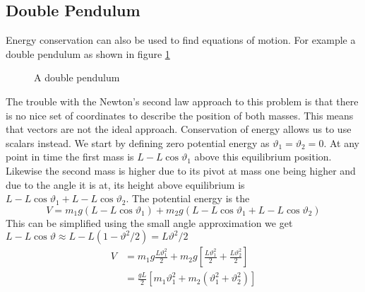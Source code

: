 \documentclass{article}
\begin{document}
    \subsection{Double Pendulum}\label{sec:double pendulum}
    Energy conservation can also be used to find equations of motion.
    For example a double pendulum as shown in figure \ref{fig:double pendulum}
    \begin{figure}[ht]
        \centering
        \caption{A double pendulum}
        \label{fig:double pendulum}
    \end{figure}
    The trouble with the Newton's second law approach to this problem is that there is no nice set of coordinates to describe the position of both masses.
    This means that vectors are not the ideal approach.
    Conservation of energy allows us to use scalars instead.
    We start by defining zero potential energy as \(\vartheta_1 = \vartheta_2 = 0\).
    At any point in time the first mass is \(L - L\cos\vartheta_1\) above this equilibrium position.
    Likewise the second mass is higher due to its pivot at mass one being higher and due to the angle it is at, its height above equilibrium is \(L - L\cos\vartheta_1 + L - L\cos\vartheta_2\).
    The potential energy is the
    \[V = m_1g(L - L\cos\vartheta_1) + m_2g(L - L\cos\vartheta_1 + L - L\cos\vartheta_2)\]
    This can be simplified using the small angle approximation we get \(L - L\cos\vartheta \approx L - L(1 - \vartheta^2/2) = L\vartheta^2/2\)
    \begin{align*}
        V &= m_1g\frac{L\vartheta_1^2}{2} + m_2g\left[\frac{L\vartheta_1^2}{2} + \frac{L\vartheta_2^2}{2}\right]\\
        &= \frac{gL}{2}\left[m_1\vartheta_1^2 + m_2(\vartheta_1^2 + \vartheta_2^2)\right]
    \end{align*}
\end{document}
